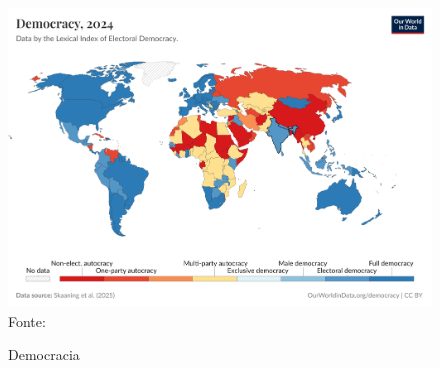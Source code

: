 \begin{figure}[htbp]
    \centering
    \caption{Democracia}
    \includegraphics[width=1\linewidth]{figuras/democracia/political-regime-lexical.png}
    \label{fig:political-regime-lexical}
    \footnotesize{Fonte: \cite{political_regime_lexical}}
\end{figure}
